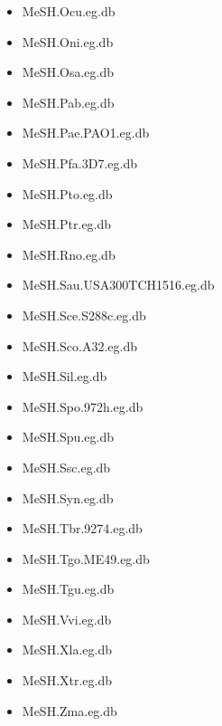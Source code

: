 \documentclass[margin,line,10pt]{res}
\newenvironment{list1}{
  \begin{list}{\ding{113}}{%
      \setlength{\itemsep}{0in}
      \setlength{\parsep}{0in} \setlength{\parskip}{0in}
      \setlength{\topsep}{0in} \setlength{\partopsep}{0in} 
      \setlength{\leftmargin}{0.17in}}}{\end{list}}
\begin{document}
\begin{resume}
\begin{list1}
\begin{multicols}{2}
\begin{itemize}
\item MeSH.Ocu.eg.db 
\item MeSH.Oni.eg.db 
\item MeSH.Osa.eg.db 
\item MeSH.Pab.eg.db 
\item MeSH.Pae.PAO1.eg.db 
\item MeSH.Pfa.3D7.eg.db
\item MeSH.Pto.eg.db 
\item MeSH.Ptr.eg.db 
\item MeSH.Rno.eg.db  
\item MeSH.Sau.USA300TCH1516.eg.db 
\item MeSH.Sce.S288c.eg.db 
\item MeSH.Sco.A32.eg.db 
\item MeSH.Sil.eg.db 
\item MeSH.Spo.972h.eg.db
\item MeSH.Spu.eg.db
\item MeSH.Ssc.eg.db 
\item MeSH.Syn.eg.db 
\item MeSH.Tbr.9274.eg.db 
\item MeSH.Tgo.ME49.eg.db
\item MeSH.Tgu.eg.db 
\item MeSH.Vvi.eg.db 
\item MeSH.Xla.eg.db  
\item MeSH.Xtr.eg.db 
\item MeSH.Zma.eg.db
\end{itemize}
\end{multicols}




\end{list1}
\end{resume}
\end{document}
